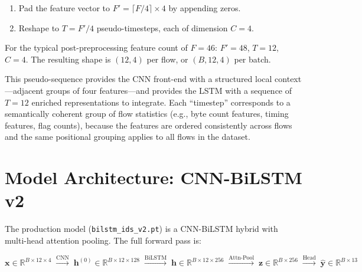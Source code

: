 \documentclass[12pt]{article}
\theoremstyle{plain}
\begin{document}
\begin{enumerate}
    \item Pad the feature vector to $F' = \lceil F / 4 \rceil \times 4$ by appending zeros.
    \item Reshape to $T = F'/4$ pseudo-timesteps, each of dimension $C = 4$.
\end{enumerate}

For the typical post-preprocessing feature count of $F = 46$: $F' = 48$, $T = 12$, $C = 4$. The resulting shape is $(12, 4)$ per flow, or $(B, 12, 4)$ per batch.

This pseudo-sequence provides the CNN front-end with a structured local context—adjacent groups of four features—and provides the LSTM with a sequence of $T = 12$ enriched representations to integrate. Each ``timestep'' corresponds to a semantically coherent group of flow statistics (e.g., byte count features, timing features, flag counts), because the features are ordered consistently across flows and the same positional grouping applies to all flows in the dataset.

\newpage

\section{Model Architecture: CNN-BiLSTM v2}
\label{sec:architecture}

The production model (\texttt{bilstm\_ids\_v2.pt}) is a CNN-BiLSTM hybrid with multi-head attention pooling. The full forward pass is:

\begin{equation}
\mathbf{x} \in \mathbb{R}^{B \times 12 \times 4}
\;\xrightarrow{\text{CNN}}\;
\mathbf{h}^{(0)} \in \mathbb{R}^{B \times 12 \times 128}
\;\xrightarrow{\text{BiLSTM}}\;
\mathbf{h} \in \mathbb{R}^{B \times 12 \times 256}
\;\xrightarrow{\text{Attn-Pool}}\;
\mathbf{z} \in \mathbb{R}^{B \times 256}
\;\xrightarrow{\text{Head}}\;
\hat{\mathbf{y}} \in \mathbb{R}^{B \times 13}
\end{equation}
\end{document}
